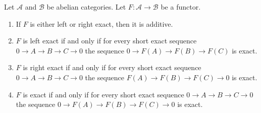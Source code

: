 \begin{lemma}
\label{lemma-exact-functor}
Let $\mathcal{A}$ and $\mathcal{B}$ be abelian categories.
Let $F : \mathcal{A} \to \mathcal{B}$ be a functor.
\begin{enumerate}
\item If $F$ is either left or right exact, then it is additive.
\item $F$ is left exact if and only if
for every short exact sequence
$0 \to A \to B \to C \to 0$
the sequence $0 \to F(A) \to F(B) \to F(C)$
is exact.
\item $F$ is right exact if and only if for every short exact sequence
$0 \to A \to B \to C \to 0$
the sequence $F(A) \to F(B) \to F(C) \to 0$
is exact.
\item $F$ is exact if and only if for every short exact sequence
$0 \to A \to B \to C \to 0$
the sequence $0 \to F(A) \to F(B) \to F(C) \to 0$
is exact.
\end{enumerate}
\end{lemma}

